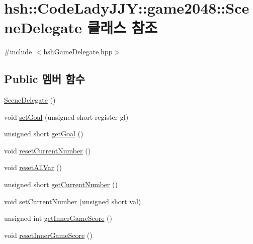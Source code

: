 \hypertarget{classhsh_1_1_code_lady_j_j_y_1_1game2048_1_1_scene_delegate}{}\section{hsh\+:\+:Code\+Lady\+J\+JY\+:\+:game2048\+:\+:Scene\+Delegate 클래스 참조}
\label{classhsh_1_1_code_lady_j_j_y_1_1game2048_1_1_scene_delegate}


{\ttfamily \#include $<$hsh\+Game\+Delegate.\+hpp$>$}

\subsection*{Public 멤버 함수}
\begin{DoxyCompactItemize}
\item 
\hyperlink{classhsh_1_1_code_lady_j_j_y_1_1game2048_1_1_scene_delegate_afa15a8d40890d55355083d2edfe001e0}{Scene\+Delegate} ()
\item 
void \hyperlink{classhsh_1_1_code_lady_j_j_y_1_1game2048_1_1_scene_delegate_af6805111081144b68d039d8f71d1ed0b}{set\+Goal} (unsigned short register gl)
\item 
unsigned short \hyperlink{classhsh_1_1_code_lady_j_j_y_1_1game2048_1_1_scene_delegate_a5766c3d3f2f5ee3a4c7664198f362e8f}{get\+Goal} ()
\item 
void \hyperlink{classhsh_1_1_code_lady_j_j_y_1_1game2048_1_1_scene_delegate_acc4d5baa06662db5472e7bdee6758fd9}{reset\+Current\+Number} ()
\item 
void \hyperlink{classhsh_1_1_code_lady_j_j_y_1_1game2048_1_1_scene_delegate_a07cb2b429428f54e4291c4c8dc63b4ac}{reset\+All\+Var} ()
\item 
unsigned short \hyperlink{classhsh_1_1_code_lady_j_j_y_1_1game2048_1_1_scene_delegate_a3539fac6a923b081e0e3f195e467f3b7}{get\+Current\+Number} ()
\item 
void \hyperlink{classhsh_1_1_code_lady_j_j_y_1_1game2048_1_1_scene_delegate_a5a18f6b50e0a4d8b4a92b13e1fb3fd85}{set\+Current\+Number} (unsigned short val)
\item 
unsigned int \hyperlink{classhsh_1_1_code_lady_j_j_y_1_1game2048_1_1_scene_delegate_af8998199e13c71f6598b1d61159d7aa0}{get\+Inner\+Game\+Score} ()
\item 
void \hyperlink{classhsh_1_1_code_lady_j_j_y_1_1game2048_1_1_scene_delegate_a99d2b67eacb056791260fb451d29e60a}{reset\+Inner\+Game\+Score} ()

\end{DoxyCompactItemize}
